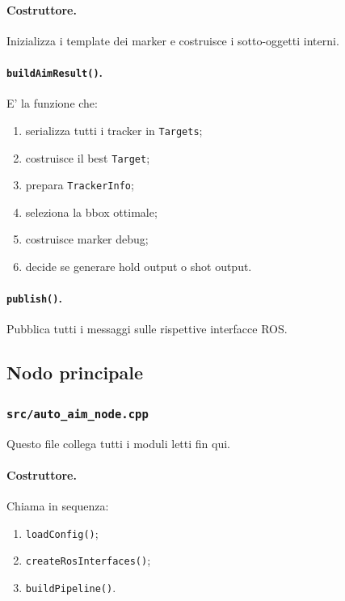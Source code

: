 \documentclass[11pt,a4paper]{article}
\newcommand{\code}[1]{\texttt{#1}}
\begin{document}
\paragraph{Costruttore.}
Inizializza i template dei marker e costruisce i sotto-oggetti interni.

\paragraph{\code{buildAimResult()}.}
E' la funzione che:
\begin{enumerate}[leftmargin=1.4em]
  \item serializza tutti i tracker in \code{Targets};
  \item costruisce il best \code{Target};
  \item prepara \code{TrackerInfo};
  \item seleziona la bbox ottimale;
  \item costruisce marker debug;
  \item decide se generare hold output o shot output.
\end{enumerate}

\paragraph{\code{publish()}.}
Pubblica tutti i messaggi sulle rispettive interfacce ROS.

\subsection{Nodo principale}

\subsubsection{\code{src/auto\_aim\_node.cpp}}

Questo file collega tutti i moduli letti fin qui.

\paragraph{Costruttore.}
Chiama in sequenza:
\begin{enumerate}[leftmargin=1.4em]
  \item \code{loadConfig()};
  \item \code{createRosInterfaces()};
  \item \code{buildPipeline()}.
\end{enumerate}
\end{document}
